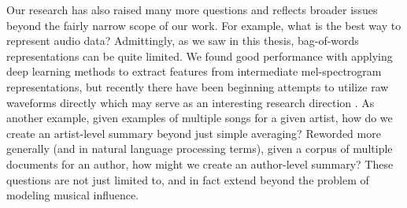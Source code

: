 Our research has also raised many more questions and reflects broader issues beyond the fairly narrow scope of our work. For example, what is the best way to represent audio data? Admittingly, as we saw in this thesis, bag-of-words representations can be quite limited. We found good performance with applying deep learning methods to extract features from intermediate mel-spectrogram representations, but recently there have been beginning attempts to utilize raw waveforms directly which may serve as an interesting research direction \cite{gong2018how}. As another example, given examples of multiple songs for a given artist, how do we create an artist-level summary beyond just simple averaging? Reworded more generally (and in natural language processing terms), given a corpus of multiple documents for an author, how might we create an author-level summary? These questions are not just limited to, and in fact extend beyond the problem of modeling musical influence.